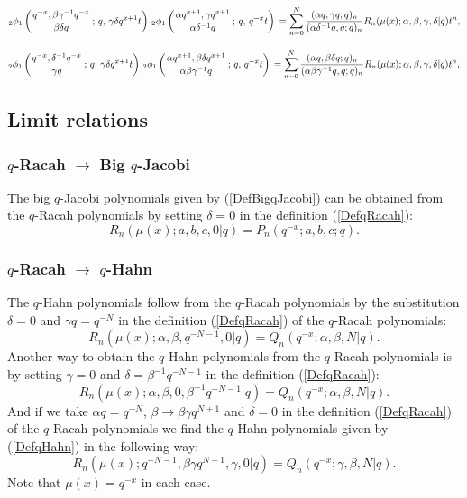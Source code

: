 \documentclass[envcountchap,graybox]{svmono}
\newcounter{rom}
\newcommand{\qhyp}[5]{\mbox{}_{#1}{\phi}_{#2}
\left(\genfrac{}{}{0pt}{}{#3}{#4}\,;\,q,\,#5\right)}
\begin{document}
\begin{equation}
\label{GenqRacah2}
\qhyp{2}{1}{q^{-x},\beta\gamma^{-1}q^{-x}}{\beta\delta q}{\gamma\delta q^{x+1}t}\,
\qhyp{2}{1}{\alpha q^{x+1},\gamma q^{x+1}}{\alpha\delta^{-1}q}{q^{-x}t}
{}=\sum_{n=0}^N\frac{(\alpha q,\gamma q;q)_n}{(\alpha\delta^{-1}q,q;q)_n}
R_n(\mu(x);\alpha,\beta,\gamma,\delta|q)t^n,
\end{equation}

\begin{equation}
\label{GenqRacah3}
\qhyp{2}{1}{q^{-x},\delta^{-1}q^{-x}}{\gamma q}{\gamma\delta q^{x+1}t}\,
\qhyp{2}{1}{\alpha q^{x+1},\beta\delta q^{x+1}}{\alpha\beta\gamma^{-1}q}{q^{-x}t}
{}=\sum_{n=0}^N\frac{(\alpha q,\beta\delta q;q)_n}{(\alpha\beta\gamma^{-1}q,q;q)_n}
R_n(\mu(x);\alpha,\beta,\gamma,\delta|q)t^n,
\end{equation}

\subsection*{Limit relations}

\subsubsection*{$q$-Racah $\rightarrow$ Big $q$-Jacobi}
The big $q$-Jacobi polynomials given by (\ref{DefBigqJacobi}) can be obtained
from the $q$-Racah polynomials by setting $\delta=0$ in the definition
(\ref{DefqRacah}):
\begin{equation}
R_n(\mu(x);a,b,c,0|q)=P_n(q^{-x};a,b,c;q).
\end{equation}

\subsubsection*{$q$-Racah $\rightarrow$ $q$-Hahn}
The $q$-Hahn polynomials follow from the $q$-Racah polynomials by the substitution
$\delta=0$ and $\gamma q=q^{-N}$ in the definition (\ref{DefqRacah}) of the
$q$-Racah polynomials:
\begin{equation}
R_n(\mu(x);\alpha,\beta,q^{-N-1},0|q)=Q_n(q^{-x};\alpha,\beta,N|q).
\end{equation}
Another way to obtain the $q$-Hahn polynomials from the $q$-Racah
polynomials is by setting $\gamma=0$ and $\delta=\beta^{-1}q^{-N-1}$ in the definition
(\ref{DefqRacah}):
\begin{equation}
R_n(\mu(x);\alpha,\beta,0,\beta^{-1}q^{-N-1}|q)=Q_n(q^{-x};\alpha,\beta,N|q).
\end{equation}
And if we take $\alpha q=q^{-N}$, $\beta\rightarrow\beta\gamma q^{N+1}$ and $\delta=0$ in the
definition (\ref{DefqRacah}) of the $q$-Racah polynomials we find the
$q$-Hahn polynomials given by (\ref{DefqHahn}) in the following way:
\begin{equation}
R_n(\mu(x);q^{-N-1},\beta\gamma q^{N+1},\gamma,0|q)=Q_n(q^{-x};\gamma,\beta,N|q).
\end{equation}
Note that $\mu(x)=q^{-x}$ in each case.
\end{document}
